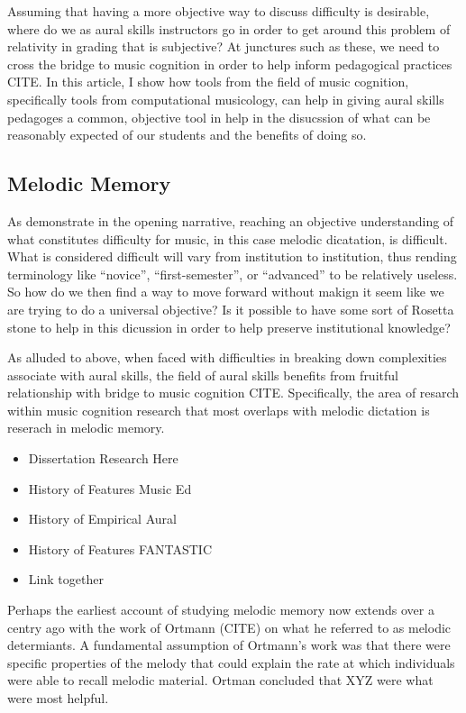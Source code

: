 \documentclass[english,man,floatsintext]{apa6}
\begin{document}
Assuming that having a more objective way to discuss difficulty is desirable, where do we as aural skills instructors go in order to get around this problem of relativity in grading that is subjective?
At junctures such as these, we need to cross the bridge to music cognition in order to help inform pedagogical practices CITE.
In this article, I show how tools from the field of music cognition, specifically tools from computational musicology, can help in giving aural skills pedagoges a common, objective tool in help in the disucssion of what can be reasonably expected of our students and the benefits of doing so.

\hypertarget{melodic-memory}{%
\subsection{Melodic Memory}\label{melodic-memory}}

As demonstrate in the opening narrative, reaching an objective understanding of what constitutes difficulty for music, in this case melodic dicatation, is difficult.
What is considered difficult will vary from institution to institution, thus rending terminology like \enquote{novice}, \enquote{first-semester}, or \enquote{advanced} to be relatively useless.
So how do we then find a way to move forward without makign it seem like we are trying to do a universal objective?
Is it possible to have some sort of Rosetta stone to help in this dicussion in order to help preserve institutional knowledge?

As alluded to above, when faced with difficulties in breaking down complexities associate with aural skills, the field of aural skills benefits from fruitful relationship with bridge to music cognition CITE.
Specifically, the area of resarch within music cognition research that most overlaps with melodic dictation is reserach in melodic memory.

\begin{itemize}
\item
  Dissertation Research Here
\item
  History of Features Music Ed
\item
  History of Empirical Aural
\item
  History of Features FANTASTIC
\item
  Link together
\end{itemize}

Perhaps the earliest account of studying melodic memory now extends over a centry ago with the work of Ortmann (CITE) on what he referred to as melodic determiants.
A fundamental assumption of Ortmann's work was that there were specific properties of the melody that could explain the rate at which individuals were able to recall melodic material.
Ortman concluded that XYZ were what were most helpful.
\end{document}
